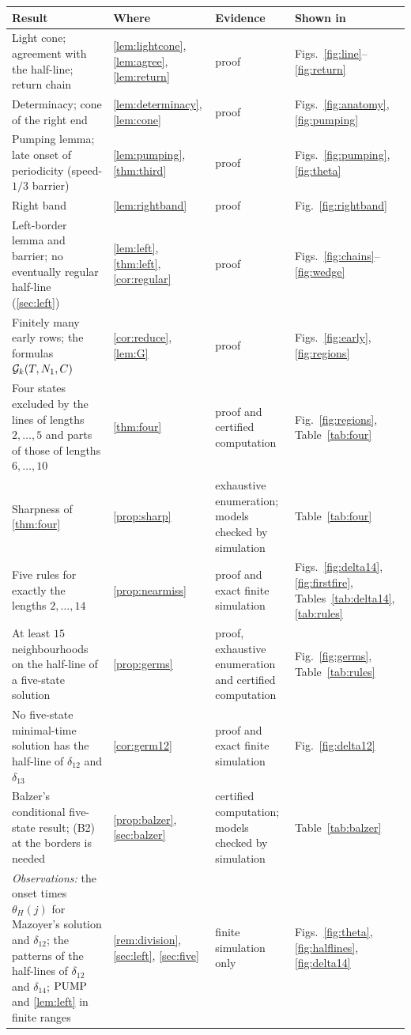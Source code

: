 \begin{tabular}{@{}>{\raggedright\arraybackslash}p{}l>{\raggedright\arraybackslash}p{}>{\raggedright\arraybackslash}p{}@{}}
\toprule
Result & Where & Evidence & Shown in\\
\midrule
Light cone; agreement with the half-line; return chain & \ref{lem:lightcone}, \ref{lem:agree}, \ref{lem:return} & proof & Figs.~\ref{fig:line}--\ref{fig:return}\\
Determinacy; cone of the right end & \ref{lem:determinacy}, \ref{lem:cone} & proof & Figs.~\ref{fig:anatomy}, \ref{fig:pumping}\\
Pumping lemma; late onset of periodicity (speed-$1/3$ barrier) & \ref{lem:pumping}, \ref{thm:third} & proof & Figs.~\ref{fig:pumping}, \ref{fig:theta}\\
Right band & \ref{lem:rightband} & proof & Fig.~\ref{fig:rightband}\\
Left-border lemma and barrier; no eventually regular half-line (\cref{sec:left}) & \ref{lem:left}, \ref{thm:left}, \ref{cor:regular} & proof & Figs.~\ref{fig:chains}--\ref{fig:wedge}\\
Finitely many early rows; the formulas $\mathcal G_k(T,N_1,C)$ & \ref{cor:reduce}, \ref{lem:G} & proof & Figs.~\ref{fig:early}, \ref{fig:regions}\\
Four states excluded by the lines of lengths $2,\dots,5$ and parts of those of lengths $6,\dots,10$ & \ref{thm:four} & proof and certified computation & Fig.~\ref{fig:regions}, Table~\ref{tab:four}\\
Sharpness of \cref{thm:four} & \ref{prop:sharp} & exhaustive enumeration; models checked by simulation & Table~\ref{tab:four}\\
Five rules for exactly the lengths $2,\dots,14$ & \ref{prop:nearmiss} & proof and exact finite simulation & Figs.~\ref{fig:delta14}, \ref{fig:firstfire}, Tables~\ref{tab:delta14}, \ref{tab:rules}\\
At least $15$ neighbourhoods on the half-line of a five-state solution & \ref{prop:germs} & proof, exhaustive enumeration and certified computation & Fig.~\ref{fig:germs}, Table~\ref{tab:rules}\\
No five-state minimal-time solution has the half-line of $\delta_{12}$ and $\delta_{13}$ & \ref{cor:germ12} & proof and exact finite simulation & Fig.~\ref{fig:delta12}\\
Balzer's conditional five-state result; (B2) at the borders is needed & \ref{prop:balzer}, \ref{sec:balzer} & certified computation; models checked by simulation & Table~\ref{tab:balzer}\\
\midrule
\emph{Observations:} the onset times $\theta_H(j)$ for Mazoyer's solution and $\delta_{12}$; the patterns of the half-lines of $\delta_{12}$ and $\delta_{14}$; $\mathrm{PUMP}$ and \cref{lem:left} in finite ranges & \ref{rem:division}, \ref{sec:left}, \ref{sec:five} & finite simulation only & Figs.~\ref{fig:theta}, \ref{fig:halflines}, \ref{fig:delta14}\\
\bottomrule
\end{tabular}
